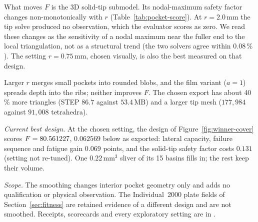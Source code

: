What moves $F$ is the 3D solid-tip submodel. Its nodal-maximum safety factor changes non-monotonically with $r$ (Table~\ref{tab:pocket-score}). At $r=2.0\,\mathrm{mm}$ the tip solve produced no observation, which the evaluator scores as zero. We read these changes as the sensitivity of a nodal maximum near the fuller end to the local triangulation, not as a structural trend (the two solvers agree within $0.08\,\%$). The setting $r=0.75\,\mathrm{mm}$, chosen visually, is also the best measured on that design.

Larger $r$ merges small pockets into rounded blobs, and the film variant ($a=1$) spreads depth into the ribs; neither improves $F$. The chosen export has about 40\,\% more triangles (STEP $86.7$ against $53.4\,\mathrm{MB}$) and a larger tip mesh ($177{,}984$ against $91{,}008$ tetrahedra).

\textit{Current best design.} At the chosen setting, the design of Figure~\ref{fig:winner-cover} scores $F=80.561227{}$, $0.062569$ below as exported: lateral capacity, failure sequence and fatigue gain $0.069$ points, and the solid-tip safety factor costs $0.131$ (setting not re-tuned). One $0.22\,\mathrm{mm^3}$ sliver of its 15 basins fills in; the rest keep their volume.

\textit{Scope.} The smoothing changes interior pocket geometry only and adds no qualification or physical observation. The Individual~2000 plate fields of Section~\ref{sec:fitness} are retained evidence of a different design and are not smoothed. Receipts, scorecards and every exploratory setting are in .
